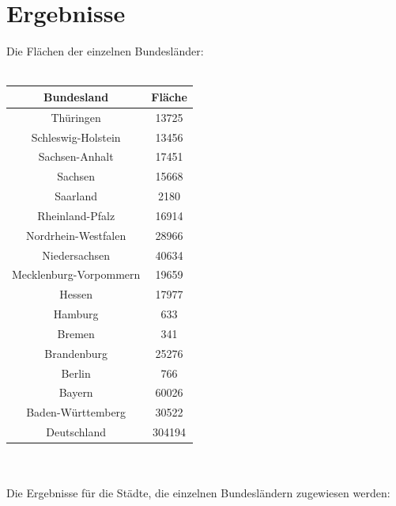 \documentclass[conference]{IEEEtran}
\begin{document}
	\section{Ergebnisse}
	Die Flächen der einzelnen Bundesländer:\\
	\\
	\begin{tabular}{|c|c|}		
		\hline
		\textbf{Bundesland} & \textbf{Fläche}\\
		\hline
		Thüringen & 13725\\
		\hline
		Schleswig-Holstein & 13456\\
		\hline
		Sachsen-Anhalt & 17451\\
		\hline
		Sachsen & 15668\\
		\hline
		Saarland & 2180\\
		\hline
		Rheinland-Pfalz & 16914\\
		\hline
		Nordrhein-Westfalen & 28966\\
		\hline
		Niedersachsen & 40634\\
		\hline
		Mecklenburg-Vorpommern & 19659\\
		\hline
		Hessen & 17977\\
		\hline
		Hamburg & 633\\
		\hline
		Bremen & 341\\
		\hline
		Brandenburg & 25276\\
		\hline
		Berlin & 766\\
		\hline
		Bayern & 60026\\
		\hline
		Baden-Württemberg & 30522\\
		\hline
		Deutschland & 304194\\
		\hline
	\end{tabular}\\
	\vspace{2.0cm}\\
	Die Ergebnisse für die Städte, die einzelnen Bundesländern zugewiesen werden:
	\vspace{0.5cm}\\
\end{document}
